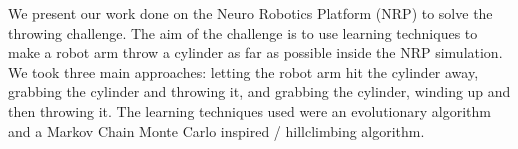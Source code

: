 We present our work done on the Neuro Robotics Platform (NRP) to solve the throwing challenge. The aim of the challenge is to use learning techniques to make a robot arm throw a cylinder as far as possible inside the NRP simulation. We took three main approaches: letting the robot arm hit the cylinder away, grabbing the cylinder and throwing it, and grabbing the cylinder, winding up and then throwing it. The learning techniques used were an evolutionary algorithm and a Markov Chain Monte Carlo inspired / hillclimbing algorithm.